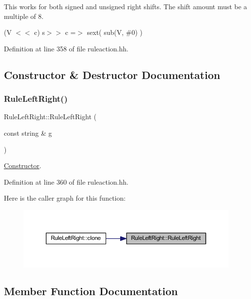 This works for both signed and unsigned right shifts. The shift amount must be a multiple of 8.

{\ttfamily (V $<$$<$ c) s$>$$>$ c =$>$ sext( sub(V, \#0) )} 

Definition at line 358 of file ruleaction.\+hh.



\subsection{Constructor \& Destructor Documentation}
\mbox{\label{class_rule_left_right_a8bdf566e71f6b94ad9e00efa29767ab4}} 
\subsubsection{\texorpdfstring{RuleLeftRight()}{RuleLeftRight()}}
{\footnotesize\ttfamily Rule\+Left\+Right\+::\+Rule\+Left\+Right (\begin{DoxyParamCaption}\item[{const string \&}]{g }\end{DoxyParamCaption})\hspace{0.3cm}{\ttfamily [inline]}}



\mbox{\hyperlink{class_constructor}{Constructor}}. 



Definition at line 360 of file ruleaction.\+hh.

Here is the caller graph for this function\+:
\nopagebreak
\begin{figure}[H]
\begin{center}
\leavevmode
\includegraphics[width=350pt]{class_rule_left_right_a8bdf566e71f6b94ad9e00efa29767ab4_icgraph}
\end{center}
\end{figure}


\subsection{Member Function Documentation}
\mbox{\label{class_rule_left_right_af92aaefc1e7def3b544a0d54adf4018f}} 
